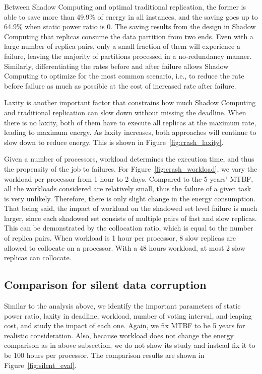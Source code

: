 Between Shadow Computing and optimal traditional replication, the former is able to save more than 49.9\% of energy in all instances, and the saving goes up to 64.9\% when static power ratio is 0. The saving results from the design in Shadow Computing that replicas consume the data partition from two ends. Even with a large number of replica pairs, only a small fraction of them will experience a failure, leaving the majority of partitions processed in a no-redundancy manner. Similarly, differentiating the rates before and after failure allows Shadow Computing to optimize for the most common scenario, i.e., to reduce the rate before failure as much as possible at the cost of increased rate after failure.

Laxity is another important factor that constrains how much Shadow Computing and traditional replication can slow down without missing the deadline. When there is no laxity, both of them have to execute all replicas at the maximum rate, leading to maximum energy. As laxity increases, both approaches will continue to slow down to reduce energy. %
This is shown in Figure~\ref{fig:crash_laxity}. %

Given a number of processors, workload determines the execution time, and thus the propensity of the job to failures. For Figure~\ref{fig:crash_workload}, we vary the workload per processor from 1 hour to 2 days. Compared to the 5 years' MTBF, all the workloads considered are relatively small, thus the failure of a given task is very unlikely. Therefore, there is only slight change in the energy consumption. That being said, the impact of workload on the shadowed set level failure is much larger, since each shadowed set consists of multiple pairs of fast and slow replicas. This can be demonstrated by the collocation ratio, which is equal to the number of replica pairs. When workload is 1 hour per processor, 8 slow replicas are allowed to collocate on a processor. With a 48 hours workload, at most 2 slow replicas can collocate. 

\subsection{Comparison for silent data corruption}
Similar to the analysis above, we identify the important parameters of static power ratio, laxity in deadline, workload, number of voting interval, and leaping cost, and study the impact of each one. Again, we fix MTBF to be 5 years for realistic consideration. Also, because workload does not change the energy comparison as in above subsection, we do not show its study and instead fix it to be 100 hours per processor. The comparison results are shown in Figure~\ref{fig:silent_eval}.

